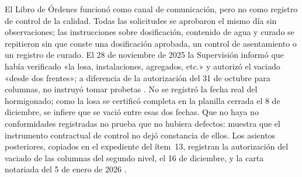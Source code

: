 El Libro de Órdenes funcionó como canal de comunicación, pero no como registro de control de la calidad. Todas las solicitudes se aprobaron el mismo día sin observaciones; las instrucciones sobre dosificación, contenido de agua y curado se repitieron sin que conste una dosificación aprobada, un control de asentamiento o un registro de curado. El 28 de noviembre de 2025 la Supervisión informó que había verificado «la losa, instalaciones, agregados, etc.» y autorizó el vaciado «desde dos frentes»; a diferencia de la autorización del 31 de octubre para columnas, no instruyó tomar probetas \parencite[pp.~121, 125]{uatf2025pao2}. No se registró la fecha real del hormigonado; como la losa se certificó completa en la planilla cerrada el 8 de diciembre, se infiere que se vació entre esas dos fechas. Que no haya no conformidades registradas no prueba que no hubiera defectos: muestra que el instrumento contractual de control no dejó constancia de ellos. Los asientos posteriores, copiados en el expediente del ítem~13, registran la autorización del vaciado de las columnas del segundo nivel, el 16 de diciembre, y la carta notariada del 5 de enero de 2026 \parencite[pp.~13--14]{uatf_item13}.

